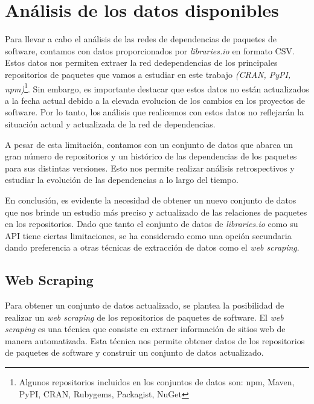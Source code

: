 

\section{Análisis de los datos disponibles}

Para llevar a cabo el análisis de las redes de dependencias de paquetes de software, contamos con 
datos proporcionados por \textit{libraries.io}\cite{jeremy_katz_2020_3626071} en formato CSV. Estos 
datos nos permiten extraer la red dedependencias de los principales repositorios de paquetes que 
vamos a estudiar en este trabajo
\textit{(CRAN, PyPI, npm)}\footnote{Algunos repositorios incluidos en los conjuntos de datos 
son: npm, Maven, PyPI, CRAN, Rubygems, Packagist, NuGet}. Sin embargo,
es importante destacar que estos datos no están actualizados a la fecha actual debido a la
elevada evolucion de los cambios en los proyectos de software. Por lo tanto, los análisis que
realicemos con estos datos no reflejarán la situación actual y actualizada de la red de dependencias.

A pesar de esta limitación, contamos con un conjunto de datos que abarca un gran número de repositorios
y un histórico de las dependencias de los paquetes para sus distintas versiones. Esto nos permite
realizar análisis retrospectivos y estudiar la evolución de las dependencias a lo largo del
tiempo.

En conclusión, es evidente la necesidad de obtener un nuevo conjunto de datos que nos brinde
un estudio más preciso y actualizado de las relaciones de paquetes en los repositorios. Dado
que tanto el conjunto de datos de \textit{libraries.io} como su API tiene ciertas limitaciones, se ha considerado como una opción
secundaria dando preferencia a otras técnicas de extracción de datos como el \textit{web scraping}.

\subsection{Web Scraping}

Para obtener un conjunto de datos actualizado, se plantea la posibilidad de realizar un
\textit{web scraping} de los repositorios de paquetes de software. El \textit{web scraping}
es una técnica que consiste en extraer información de sitios web de manera automatizada.
Esta técnica nos permite obtener datos de los repositorios de paquetes de software y
construir un conjunto de datos actualizado.

